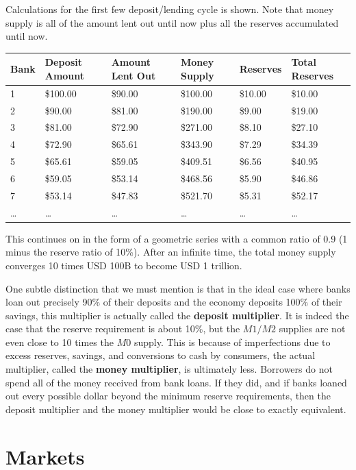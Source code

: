 \documentclass{article}
\begin{document}
      Calculations for the first few deposit/lending cycle is shown. Note that money supply is all of the amount lent out until now plus all the reserves accumulated until now.

      \begin{tabular}{|l|l|l|l|l|l|}
      \hline
      Bank & Deposit Amount & Amount Lent Out & Money Supply & Reserves & Total Reserves \\
      \hline
      1 & \$100.00 & \$90.00 & \$100.00 & \$10.00 & \$10.00 \\
      2 & \$90.00 & \$81.00 & \$190.00 & \$9.00 & \$19.00 \\
      3 & \$81.00 & \$72.90 & \$271.00 & \$8.10 & \$27.10 \\
      4 & \$72.90 & \$65.61 & \$343.90 & \$7.29 & \$34.39 \\
      5 & \$65.61 & \$59.05 & \$409.51 & \$6.56 & \$40.95 \\
      6 & \$59.05 & \$53.14 & \$468.56 & \$5.90 & \$46.86 \\
      7 & \$53.14 & \$47.83 & \$521.70 & \$5.31 & \$52.17 \\
      \ldots & \ldots & \ldots & \ldots & \ldots & \ldots \\
      \hline
      \end{tabular}

      This continues on in the form of a geometric series with a common ratio of 0.9 (1 minus the reserve ratio of 10\%). After an infinite time, the total money supply converges 10 times USD 100B to become USD 1 trillion.

      One subtle distinction that we must mention is that in the ideal case where banks loan out precisely 90\% of their deposits and the economy deposits 100\% of their savings, this multiplier is actually called the \textbf{deposit multiplier}. It is indeed the case that the reserve requirement is about 10\%, but the $M1/M2$ supplies are not even close to 10 times the $M0$ supply. This is because of imperfections due to excess reserves, savings, and conversions to cash by consumers, the actual multiplier, called the \textbf{money multiplier}, is ultimately less. Borrowers do not spend all of the money received from bank loans. If they did, and if banks loaned out every possible dollar beyond the minimum reserve requirements, then the deposit multiplier and the money multiplier would be close to exactly equivalent.

\section{Markets}
\end{document}
